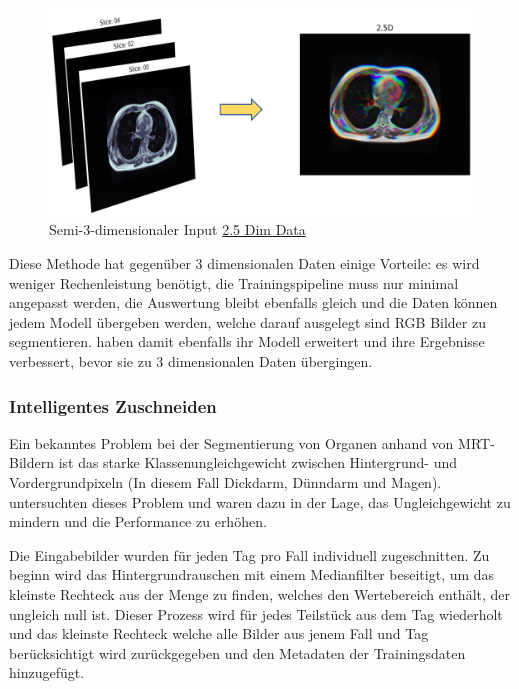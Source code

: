 \begin{figure}[H]
	\begin{center}
		\includegraphics[width=350pt]{bilder/25d_input}
		\caption{Semi-3-dimensionaler Input \href{https://www.kaggle.com/competitions/uw-madison-gi-tract-image-segmentation/discussion/322549}{2.5 Dim Data}}\label{Fig:25d-data}
	\end{center}
\end{figure}

Diese Methode hat gegenüber 3 dimensionalen Daten einige Vorteile: es wird weniger Rechenleistung benötigt, die Trainingspipeline muss nur minimal angepasst werden, die Auswertung bleibt ebenfalls gleich und die Daten können jedem Modell übergeben werden, welche darauf ausgelegt sind RGB Bilder zu segmentieren. \cite{Chen_2020} haben damit ebenfalls ihr Modell erweitert und ihre Ergebnisse verbessert, bevor sie zu 3 dimensionalen Daten übergingen.

\subsubsection{Intelligentes Zuschneiden} \label{ssec:intellicrop}

Ein bekanntes Problem bei der Segmentierung von Organen anhand von MRT-Bildern ist das starke Klassenungleichgewicht zwischen Hintergrund- und Vordergrundpixeln (In diesem Fall Dickdarm, Dünndarm und Magen). \citet{SmartCrop} untersuchten dieses Problem und waren dazu in der Lage, das Ungleichgewicht zu mindern und die Performance zu erhöhen. 

Die Eingabebilder wurden für jeden Tag pro Fall individuell zugeschnitten. Zu beginn wird das Hintergrundrauschen mit einem Medianfilter beseitigt, um das kleinste Rechteck aus der Menge zu finden, welches den Wertebereich enthält, der ungleich null ist. Dieser Prozess wird für jedes Teilstück aus dem Tag wiederholt und das kleinste Rechteck welche alle Bilder aus jenem Fall und Tag berücksichtigt wird zurückgegeben und den Metadaten der Trainingsdaten hinzugefügt.

